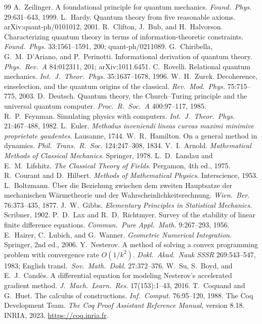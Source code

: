 \documentclass[10pt,twocolumn]{article}
\theoremstyle{definition}
\begin{document}
\begin{thebibliography}{99}
 A.~Zeilinger. A foundational principle for quantum mechanics. \emph{Found.\ Phys.} 29:631--643, 1999.
 L.~Hardy. Quantum theory from five reasonable axioms. arXiv:quant-ph/0101012, 2001.
 R.~Clifton, J.~Bub, and H.~Halvorson. Characterizing quantum theory in terms of information-theoretic constraints. \emph{Found.\ Phys.} 33:1561--1591, 200; quant-ph/0211089.
 G.~Chiribella, G.~M.~D'Ariano, and P.~Perinotti. Informational derivation of quantum theory. \emph{Phys.\ Rev.\ A} 84:012311, 201; arXiv:1011.6451.
 C.~Rovelli. Relational quantum mechanics. \emph{Int.\ J.\ Theor.\ Phys.} 35:1637--1678, 1996.
 W.~H.~Zurek. Decoherence, einselection, and the quantum origins of the classical. \emph{Rev.\ Mod.\ Phys.} 75:715--775, 2003.
 D.~Deutsch. Quantum theory, the Church--Turing principle and the universal quantum computer. \emph{Proc.\ R.\ Soc.\ A} 400:97--117, 1985.
 R.~P.~Feynman. Simulating physics with computers. \emph{Int.\ J.\ Theor.\ Phys.} 21:467--488, 1982.
 L.~Euler. \emph{Methodus inveniendi lineas curvas maximi minimive proprietate gaudentes}. Lausanne, 1744.
 W.~R.~Hamilton. On a general method in dynamics. \emph{Phil.\ Trans.\ R.\ Soc.} 124:247--308, 1834.
 V.~I.~Arnold. \emph{Mathematical Methods of Classical Mechanics}. Springer, 1978.
 L.~D.~Landau and E.~M.~Lifshitz. \emph{The Classical Theory of Fields}. Pergamon, 4th ed., 1975.
 R.~Courant and D.~Hilbert. \emph{Methods of Mathematical Physics}. Interscience, 1953.
 L.~Boltzmann. \"Uber die Beziehung zwischen dem zweiten Hauptsatze der mechanischen W\"armetheorie und der Wahrscheinlichkeitsrechnung. \emph{Wien.\ Ber.} 76:373--435, 1877.
 J.~W.~Gibbs. \emph{Elementary Principles in Statistical Mechanics}. Scribner, 1902.
 P.~D.~Lax and R.~D.~Richtmyer. Survey of the stability of linear finite difference equations. \emph{Commun.\ Pure Appl.\ Math.} 9:267--293, 1956.
 E.~Hairer, C.~Lubich, and G.~Wanner. \emph{Geometric Numerical Integration}. Springer, 2nd ed., 2006.
 Y.~Nesterov. A method of solving a convex programming problem with convergence rate $O(1/k^2)$. \emph{Dokl.\ Akad.\ Nauk SSSR} 269:543--547, 1983; English transl.\ \emph{Sov.\ Math.\ Dokl.} 27:372--376.
 W.~Su, S.~Boyd, and E.~J.~Cand\`es. A differential equation for modeling Nesterov's accelerated gradient method. \emph{J.\ Mach.\ Learn.\ Res.} 17(153):1--43, 2016.
 T.~Coquand and G.~Huet. The calculus of constructions. \emph{Inf.\ Comput.} 76:95--120, 1988.
 The Coq Development Team. \emph{The Coq Proof Assistant Reference Manual}, version 8.18. INRIA, 2023.
\url{https://coq.inria.fr}.
\end{thebibliography}
\end{document}
